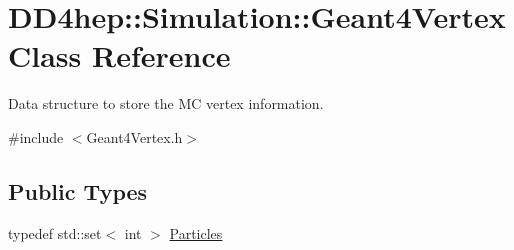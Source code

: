 \hypertarget{class_d_d4hep_1_1_simulation_1_1_geant4_vertex}{
\section{DD4hep::Simulation::Geant4Vertex Class Reference}
\label{class_d_d4hep_1_1_simulation_1_1_geant4_vertex}
}


Data structure to store the MC vertex information.  


{\ttfamily \#include $<$Geant4Vertex.h$>$}\subsection*{Public Types}
\begin{DoxyCompactItemize}
\item 
typedef std::set$<$ int $>$ \hyperlink{class_d_d4hep_1_1_simulation_1_1_geant4_vertex_a7a0331b96dfa8ff9b4a802caa8dd031c}{Particles}
\end{DoxyCompactItemize}
